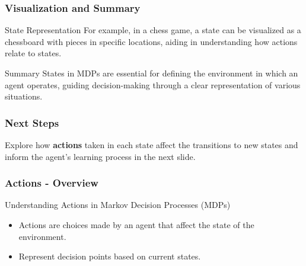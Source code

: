 \documentclass{beamer}
\begin{document}
\begin{frame}[fragile]
    \frametitle{Visualization and Summary}
    \begin{block}{State Representation}
        For example, in a chess game, a state can be visualized as a chessboard with pieces in specific locations, aiding in understanding how actions relate to states.
    \end{block}

    \begin{block}{Summary}
        States in MDPs are essential for defining the environment in which an agent operates, guiding decision-making through a clear representation of various situations.
    \end{block}
\end{frame}

\begin{frame}[fragile]
    \frametitle{Next Steps}
    Explore how \textbf{actions} taken in each state affect the transitions to new states and inform the agent's learning process in the next slide.
\end{frame}

\begin{frame}[fragile]
    \frametitle{Actions - Overview}
    \begin{block}{Understanding Actions in Markov Decision Processes (MDPs)}
        \begin{itemize}
            \item Actions are choices made by an agent that affect the state of the environment.
            \item Represent decision points based on current states.
        \end{itemize}
    \end{block}
\end{frame}
\end{document}
